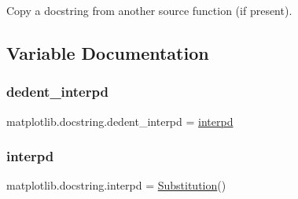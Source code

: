 \begin{DoxyVerb}Copy a docstring from another source function (if present).\end{DoxyVerb}
 

\subsection{Variable Documentation}
\mbox{\label{namespacematplotlib_1_1docstring_accdc7041014e961f4c48fe7540998d38}} 
\subsubsection{\texorpdfstring{dedent\+\_\+interpd}{dedent\_interpd}}
{\footnotesize\ttfamily matplotlib.\+docstring.\+dedent\+\_\+interpd = \hyperlink{namespacematplotlib_1_1docstring_adb2bde075939e0557d716d59fb6db7fb}{interpd}}

\mbox{\label{namespacematplotlib_1_1docstring_adb2bde075939e0557d716d59fb6db7fb}} 
\subsubsection{\texorpdfstring{interpd}{interpd}}
{\footnotesize\ttfamily matplotlib.\+docstring.\+interpd = \hyperlink{classmatplotlib_1_1docstring_1_1Substitution}{Substitution}()}

